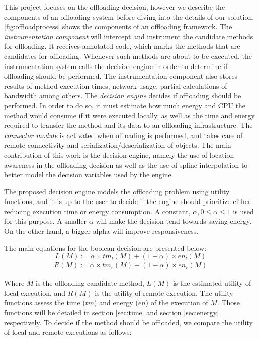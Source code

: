 \documentclass[10pt, conference, letterpaper]{IEEEtran}
\begin{document}
  This project focuses on the offloading decision, however we describe the components of an offloading system before diving into the details of our solution. \ref{fig:offloadprocess} shows the components of an offloading framework. The {\it instrumentation component} will intercept and instrument the candidate methods for offloading. It receives annotated code, which marks the methods that are candidates for offloading. Whenever such methods are about to be executed, the instrumentation system calls the decision engine in order to determine if offloading should be performed. The instrumentation component also stores results of method execution times, network usage, partial calculations of bandwidth among others. The {\it decision engine} decides if offloading should be performed. In order to do so, it must estimate how much energy and CPU the method would consume if it were executed locally, as well as the time and energy required to transfer the method and its data to an offloading infrastructure.  The {\it connector module} is activated when offloading is performed, and takes care of remote connectivity and serialization/deserialization of objects.  The main contribution of this work is the decision engine, namely the use of location awareness in the offloading decision as well as the use of spline interpolation to better model the decision variables used by the engine.
  
  The proposed decision engine models the offloading problem using utility functions, and it is up to the user to decide if the engine should prioritize either reducing execution time or energy consumption. A constant, $\alpha, 0 \leq \alpha \leq 1$ is used for this purpose. A smaller $\alpha$ will make the decision tend towards saving energy. On the other hand, a bigger alpha will improve responsiveness. 

  The main equations for the boolean decision are presented below:
  \begin{equation} \label{eq:localutility}
    L(M) := \alpha \times tm_{l}(M) + (1-\alpha) \times en_{l}(M) 
  \end{equation}
  \begin{equation} \label{eq:remoteutility}
  \begin{multlined}
    R(M) := \alpha \times tm_{r}(M) + (1-\alpha) \times en_{r}(M) 
  \end{multlined}
  \end{equation}

  Where $M$ is the offloading candidate method, $L(M)$ is the estimated utility of local execution, and $R(M)$ is the utility of remote execution. The utility functions assess the time ($tm$) and energy ($en$) of the execution of $M$. Those functions will be detailed in section \ref{sec:time} and section \ref{sec:energy} respectively. To decide if the method should be offloaded, we compare the utility of local and remote executions as follows: 
\end{document}
